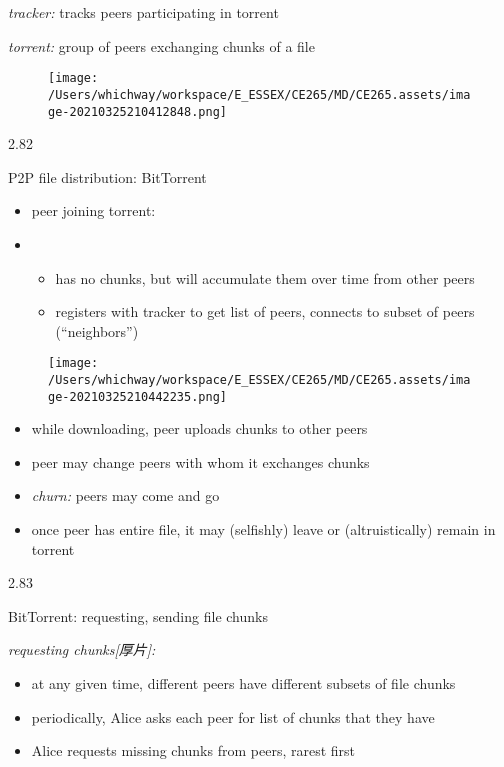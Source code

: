 \documentclass[
]{article}
\begin{document}
\emph{tracker:} tracks peers participating in torrent

\emph{torrent:} group of peers exchanging chunks of a file

\begin{figure}
\centering
\texttt{[image: /Users/whichway/workspace/E\_ESSEX/CE265/MD/CE265.assets/image-20210325210412848.png]}
\caption{}
\end{figure}

2.82

P2P file distribution: BitTorrent

\begin{itemize}
\item
  peer joining torrent:
\item
  \begin{itemize}
  \item
    has no chunks, but will accumulate them over time from other peers
  \item
    registers with tracker to get list of peers, connects to subset of
    peers (``neighbors'')
  \end{itemize}
\end{itemize}

\begin{figure}
\centering
\texttt{[image: /Users/whichway/workspace/E\_ESSEX/CE265/MD/CE265.assets/image-20210325210442235.png]}
\caption{}
\end{figure}

\begin{itemize}
\item
  while downloading, peer uploads chunks to other peers
\item
  peer may change peers with whom it exchanges chunks
\item
  \emph{churn:} peers may come and go
\item
  once peer has entire file, it may (selfishly) leave or
  (altruistically) remain in torrent
\end{itemize}

2.83

BitTorrent: requesting, sending file chunks

\emph{requesting chunks{[}厚片{]}:}

\begin{itemize}
\item
  at any given time, different peers have different subsets of file
  chunks
\item
  periodically, Alice asks each peer for list of chunks that they have
\item
  Alice requests missing chunks from peers, rarest first
\end{itemize}
\end{document}
